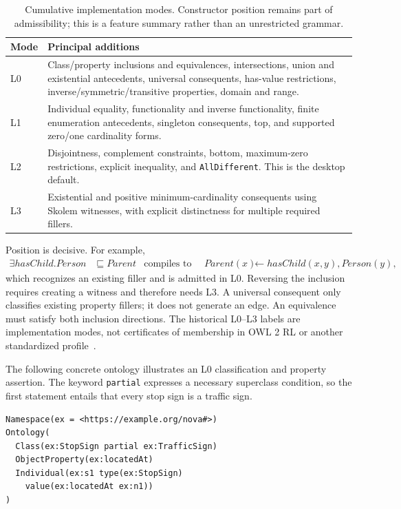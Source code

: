 \documentclass{article}
\newcommand{\code}[1]{\texttt{#1}}
\begin{document}
\begin{table}[t]
\centering\small
\caption{Cumulative implementation modes. Constructor position remains part of
admissibility; this is a feature summary rather than an unrestricted grammar.}
\label{tab:profiles}
\begin{tabularx}{\linewidth}{lY}
\toprule
Mode & Principal additions \\
\midrule
L0 & Class/property inclusions and equivalences, intersections, union and
existential antecedents, universal consequents, has-value restrictions,
inverse/symmetric/transitive properties, domain and range. \\
L1 & Individual equality, functionality and inverse functionality, finite
enumeration antecedents, singleton consequents, top, and supported zero/one
cardinality forms. \\
L2 & Disjointness, complement constraints, bottom, maximum-zero restrictions,
explicit inequality, and \code{AllDifferent}. This is the desktop default. \\
L3 & Existential and positive minimum-cardinality consequents using Skolem
witnesses, with explicit distinctness for multiple required fillers. \\
\bottomrule
\end{tabularx}
\end{table}

Position is decisive. For example,
\begin{align*}
\exists\mathit{hasChild}.\mathit{Person}&\sqsubseteq\mathit{Parent}
&\text{compiles to }\quad
\mathit{Parent}(x)&\leftarrow\mathit{hasChild}(x,y),\mathit{Person}(y),
\end{align*}
which recognizes an existing filler and is admitted in L0. Reversing the
inclusion requires creating a witness and therefore needs L3. A universal
consequent only classifies existing property fillers; it does not generate an
edge. An equivalence must satisfy both inclusion directions. The historical
L0--L3 labels are implementation modes, not certificates of membership in
OWL 2 RL or another standardized profile~\cite{owlprofiles2012}.

The following concrete ontology illustrates an L0 classification and property
assertion. The keyword \code{partial} expresses a necessary superclass
condition, so the first statement entails that every stop sign is a traffic
sign.
\begin{lstlisting}
Namespace(ex = <https://example.org/nova#>)
Ontology(
  Class(ex:StopSign partial ex:TrafficSign)
  ObjectProperty(ex:locatedAt)
  Individual(ex:s1 type(ex:StopSign)
    value(ex:locatedAt ex:n1))
)
\end{lstlisting}
\end{document}

